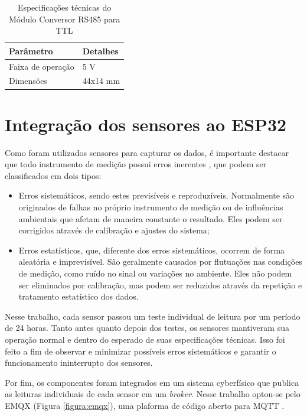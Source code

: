 \begin{table}[!htb]
  \caption{Especificações técnicas do Módulo Conversor RS485 para TTL}
  \begin{tabularx}{\textwidth}{|X|X|} \hline
      \textbf{Parâmetro} & \textbf{Detalhes} \\ \hline
      Faixa de operação & 5 V \\ \hline
      Dimensões & 44x14 mm \\ \hline
  \end{tabularx}
  \label{tab:rs485}
\end{table}

\section{Integração dos sensores ao ESP32}

Como foram utilizados sensores para capturar os dados, é importante destacar que todo instrumento de medição possui erros inerentes \parencite{Vuolo_erro1996}, que podem ser classificados em dois tipos:

\begin{itemize} 
    \item Erros sistemáticos, sendo estes previsíveis e reproduzíveis. Normalmente são originados de falhas no próprio instrumento de medição ou de influências ambientais que afetam de maneira constante o resultado. Eles podem ser corrigidos através de calibração e ajustes do sistema;
    \item Erros estatísticos, que, diferente dos erros sistemáticos, ocorrem de forma aleatória e imprevisível. São geralmente causados por flutuações nas condições de medição, como ruído no sinal ou variações no ambiente. Eles não podem ser eliminados por calibração, mas podem ser reduzidos através da repetição e tratamento estatístico dos dados. 
\end{itemize}

Nesse trabalho, cada sensor passou um teste individual de leitura por um período de 24 horas. Tanto antes quanto depois dos testes, os sensores mantiveram sua operação normal e dentro do esperado de suas especificações técnicas. Isso foi feito a fim de observar e minimizar possíveis erros sistemáticos e garantir o funcionamento ininterrupto dos sensores.

Por fim, os componentes foram integrados em um sistema cyberfísico que publica as leituras individuais de cada sensor em um \textit{broker}. Nesse trabalho optou-se pelo EMQX (Figura \ref{figura:emqx}), uma plaforma de código aberto para MQTT \parencite{EMQX}.


